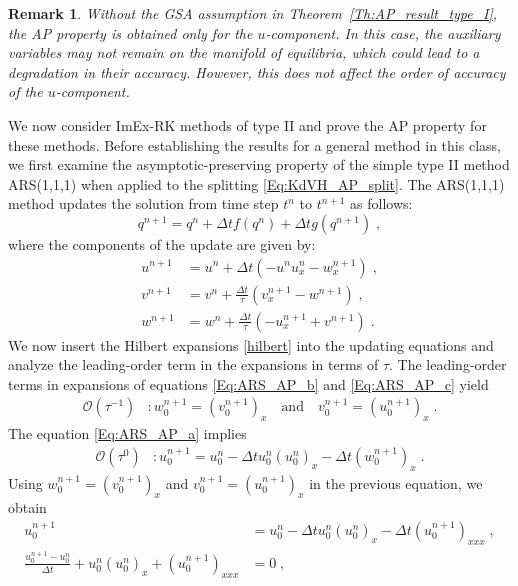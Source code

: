 \documentclass{article}
\newtheorem{remark}{Remark}
\begin{document}
\begin{remark} \label{rem:no-GSA}
    Without the GSA assumption in Theorem~\ref{Th:AP_result_type_I}, the AP property is obtained only for the $u$-component.
    In this case, the auxiliary variables may not remain on the manifold of equilibria, which could lead to a
    degradation in their accuracy. However, this does not affect the order of accuracy of the $u$-component.
\end{remark}

We now consider ImEx-RK methods of type II and prove the AP property for these methods. Before establishing the results for a general method in this class, we first examine the asymptotic-preserving property of the simple type II method ARS(1,1,1) when applied to the splitting \eqref{Eq:KdVH_AP_split}. The ARS(1,1,1) method updates the solution from time step $t^n$ to $t^{n+1}$ as follows:
$$
q^{n+1} = q^n + \Delta t f\left(q^{n}\right) + \Delta t g\left(q^{n+1}\right) \;,
$$
where the components of the update are given by:
\begin{subequations}
\begin{align}
u^{n+1} & = u^{n} + \Delta t \left(- u^{n} u_x^{n} -w_x^{n+1} \right)  \;, \label{Eq:ARS_AP_a}  \\
v^{n+1} & = v^{n} + \frac{\Delta t }{\tau}\left(v_x^{n+1} - w^{n+1}  \right)   \;, \label{Eq:ARS_AP_b}  \\
w^{n+1} & = w^{n} + \frac{\Delta t }{\tau}\left(-u_x^{n+1} + v^{n+1}  \right)   \;. \label{Eq:ARS_AP_c}
\end{align}
\end{subequations}
We now insert the Hilbert expansions \eqref{hilbert}
into the updating equations and analyze the leading-order term in the expansions in terms of $\tau$. The leading-order terms in expansions of equations \eqref{Eq:ARS_AP_b} and \eqref{Eq:ARS_AP_c} yield
\begin{align*}
    \mathcal{O}\left(\tau^{-1}\right) &\colon w^{n+1}_0  = (v_0^{n+1})_x  \quad \text{and} \quad v^{n+1}_0  = (u_0^{n+1})_x \;.
\end{align*}
The equation \eqref{Eq:ARS_AP_a} implies
\begin{align*}
    \mathcal{O}\left(\tau^{0}\right) &\colon u^{n+1}_0 = u^{n}_0 - \Delta t u^{n}_0 (u^{n}_0)_x  -\Delta t  (w^{n+1}_0)_x\;.
\end{align*}
 Using $w^{n+1}_0  = (v_0^{n+1})_x$ and $v^{n+1}_0  = (u_0^{n+1})_x$ in the previous equation, we obtain
\begin{align*}
     u^{n+1}_0 & = u^{n}_0 - \Delta t u^{n}_0 (u_0^{n})_x -\Delta t (u^{n+1}_0)_{xxx}  \;, \\
     \frac{u^{n+1}_0-u^{n}_0}{\Delta t } + u^{n}_0 (u_0^{n})_x  + (u^{n+1}_0)_{xxx}  & = 0 \;,
\end{align*}
\end{document}
